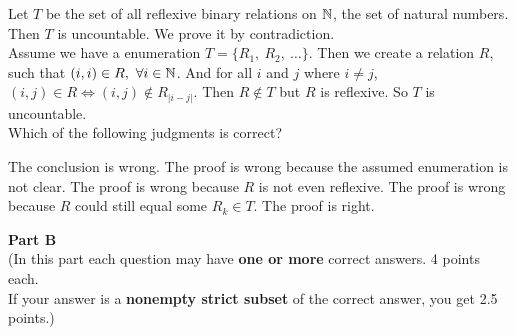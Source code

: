 \begin{questions}
\question Let $T$ be the set of all reflexive binary relations on ${\mathbb N}{}$, the set of natural numbers. Then $T$ is uncountable. We prove it by contradiction.\\

Assume we have a enumeration $T = \{R_1,\ R_2,\ \dots\}$. Then we create a relation $R$, such that $(i,i)\in R,\ \forall i\in {\mathbb N}{}$. And for all $i$ and $j$ where $i\neq j$, $(i,j)\in R \iff (i,j)\not\in R_{\lvert i-j \rvert}$. Then $R\not\in T$ but $R$ is reflexive. So $T$ is uncountable.\\

Which of the following judgments is correct?
\begin{choices}
\choice The conclusion is wrong.
\choice The proof is wrong because the assumed enumeration is not clear.
\choice The proof is wrong because $R$ is not even reflexive.
\choice The proof is wrong because $R$ could still equal some $R_k\in T$.
\choice The proof is right.
\end{choices}

\end{questions}

\newpage

\begin{center}
{\bf Part B}\\
\medskip
(In this part each question may have {\bf one or more} correct answers. 4 points each.\\ If your answer is a {\bf nonempty strict subset} of the correct answer, you get 2.5 points.)
\end{center}
\bigskip

